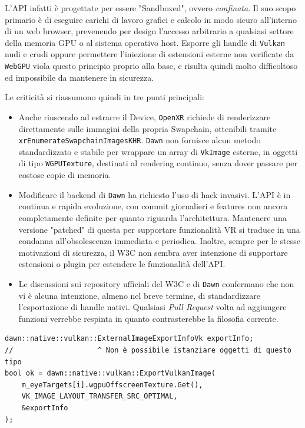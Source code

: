 \documentclass[a4paper, 11pt, twoside]{report}
\begin{document}
L'API infatti è progettate per essere "Sandboxed", ovvero \textit{confinata}. Il suo scopo primario è di eseguire
carichi di lavoro grafici e calcolo in modo sicuro all'interno di un web browser, prevenendo per design l'accesso
arbitrario a qualsiasi settore della memoria GPU o al sistema operativo host.
Esporre gli handle di \texttt{\gls{Vulkan}} nudi e crudi oppure permettere l'iniezione di estensioni esterne non
verificate da \texttt{WebGPU} viola questo principio proprio alla base, e risulta quindi molto difficoltoso ed
impossibile da mantenere in sicurezza.

Le criticità si riassumono quindi in tre punti principali:

\begin{itemize}
    \item Anche riuscendo ad estrarre il Device, \texttt{\gls{OpenXR}} richiede di renderizzare direttamente sulle
        immagini della propria \gls{Swapchain}, ottenibili tramite \texttt{xrEnumerateSwapchainImagesKHR}.
        \texttt{Dawn} non fornisce alcun metodo standardizzato e stabile per wrappare un array di \texttt{VkImage}
        esterne, in oggetti di tipo \texttt{WGPUTexture}, destinati al rendering continuo, senza dover passare per
        costose copie di memoria.
    \item Modificare il backend di \texttt{Dawn} ha richiesto l'uso di hack invasivi. L'API è in continua e rapida
        evoluzione, con commit giornalieri e features non ancora completamente definite per quanto riguarda
        l'architettura. Mantenere una versione "patched" di questa per supportare funzionalità VR si traduce in una
        condanna all'obsolescenza immediata e periodica. Inoltre, sempre per le stesse motivazioni di sicurezza, il W3C
        non sembra aver intenzione di supportare estensioni o plugin per estendere le funzionalità dell'API.
    \item Le discussioni sui repository ufficiali del W3C e di \texttt{Dawn} confermano che non vi è alcuna intenzione,
        almeno nel breve termine, di standardizzare l'esportazione di handle nativi. Qualsiasi \textit{\gls{Pull Request}}
        volta ad aggiungere funzioni verrebbe respinta in quanto contrasterebbe la filosofia corrente.
\end{itemize}

\begin{listing}[!ht]
\begin{verbatim}
dawn::native::vulkan::ExternalImageExportInfoVk exportInfo;
//                    ^ Non è possibile istanziare oggetti di questo tipo 
bool ok = dawn::native::vulkan::ExportVulkanImage(
    m_eyeTargets[i].wgpuOffscreenTexture.Get(),
    VK_IMAGE_LAYOUT_TRANSFER_SRC_OPTIMAL,
    &exportInfo
);
\end{verbatim}
\vspace{-0.75cm}
\caption{Costruttore inaccessibile per \texttt{ExternalImageExportInfoVK}}
\label{listing:eivconstructor}
\end{listing}
\end{document}
